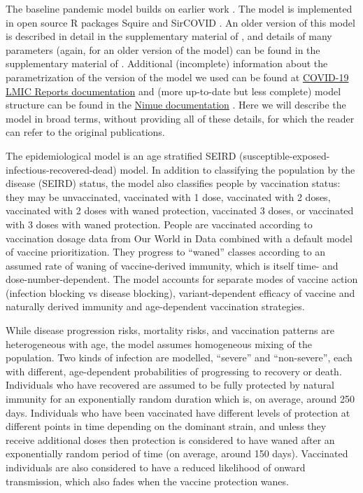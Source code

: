 \documentclass{article}
\begin{document}
The baseline pandemic model builds on earlier work \citep{watsonoliverj.COVID19LMICReports2022}. The model is implemented in open source R packages Squire and SirCOVID \citep[@walkerImpactCOVID19Strategies2020,@baguelinSircovidSIRModel2022]{hoganWithincountryAgebasedPrioritisation2021}. An older version of this model is described in detail in the supplementary material of \citet{walkerImpactCOVID19Strategies2020}, and details of many parameters (again, for an older version of the model) can be found in the supplementary material of \citet{watsonGlobalImpactFirst2022}. Additional (incomplete) information about the parametrization of the version of the model we used can be found at \href{https://web.archive.org/web/20221230232942/https://mrc-ide.github.io/global-lmic-reports/parameters.html}{COVID-19 LMIC Reports documentation} \citep{watsonoliverj.COVID19LMICReports2022} and (more up-to-date but less complete) model structure can be found in the \href{https://web.archive.org/web/20221230232915/https://mrc-ide.github.io/nimue/index.html}{Nimue documentation} \citep{winskillNimue}. Here we will describe the model in broad terms, without providing all of these details, for which the reader can refer to the original publications.

The epidemiological model is an age stratified SEIRD (susceptible-exposed-infectious-recovered-dead) model. In addition to classifying the population by the disease (SEIRD) status, the model also classifies people by vaccination status: they may be unvaccinated, vaccinated with 1 dose, vaccinated with 2 doses, vaccinated with 2 doses with waned protection, vaccinated 3 doses, or vaccinated with 3 doses with waned protection. People are vaccinated according to vaccination dosage data from Our World in Data \citep{mathieuCoronavirusPandemicCOVID192020} combined with a default model of vaccine prioritization. They progress to ``waned'' classes according to an assumed rate of waning of vaccine-derived immunity, which is itself time- and dose-number-dependent. The model accounts for separate modes of vaccine action (infection blocking vs disease blocking), variant-dependent efficacy of vaccine and naturally derived immunity and age-dependent vaccination strategies.

While disease progression risks, mortality risks, and vaccination patterns are heterogeneous with age, the model assumes homogeneous mixing of the population. Two kinds of infection are modelled, ``severe'' and ``non-severe'', each with different, age-dependent probabilities of progressing to recovery or death. Individuals who have recovered are assumed to be fully protected by natural immunity for an exponentially random duration which is, on average, around 250 days. Individuals who have been vaccinated have different levels of protection at different points in time depending on the dominant strain, and unless they receive additional doses then protection is considered to have waned after an exponentially random period of time (on average, around 150 days). Vaccinated individuals are also considered to have a reduced likelihood of onward transmission, which also fades when the vaccine protection wanes.
\end{document}
